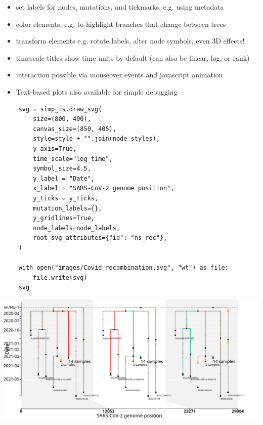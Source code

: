 \documentclass[landscape,a0paper,fontscale=0.4]{baposter}
\newcommand{\compresslist}{%
 \setlength{\itemsep}{1pt}%
 \setlength{\parskip}{0pt}%
 \setlength{\parsep}{0pt}%
 }
\begin{document}
\begin{poster}
\begin{posterbox}[name=vizlist,below=viz,column=1,row=0,span=1]{}
\begin{itemize} \compresslist
    \item set labels for nodes, mutations, and tickmarks, e.g. using metadata
    \item color elements, e.g. to highlight branches that change between trees
    \item transform elements e.g. rotate labels, alter node symbols, even 3D effects!
    \item timescale titles show time units by default (can also be linear, log, or rank)
    \item interaction possible via mouseover events and javascript animation
    \item Text-based plots also available for simple debugging
\end{itemize}

\end{posterbox}


\begin{posterbox}[name=vizex,below=viz,column=2,row=0,span=1]{}

\begin{verbatim}
    svg = simp_ts.draw_svg(
        size=(800, 400),
        canvas_size=(850, 405),
        style=style + "".join(node_styles),
        y_axis=True,
        time_scale="log_time",
        symbol_size=4.5,
        y_label = "Date",
        x_label = "SARS-CoV-2 genome position",
        y_ticks = y_ticks,
        mutation_labels={},
        y_gridlines=True,
        node_labels=node_labels,
        root_svg_attributes={"id": "ns_rec"},
    )

    with open("images/Covid_recombination.svg", "wt") as file:
        file.write(svg)
    svg
\end{verbatim}

\includegraphics[width=\textwidth]{Covid_recombination}


\end{posterbox}
\end{poster}
\end{document}
